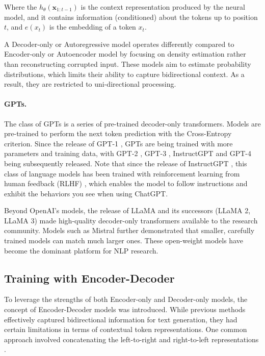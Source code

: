 Where the $h_{\theta}(\textbf{x}_{1:t-1})$ is the context representation produced by the neural model, and it contains information (conditioned) about the tokens up to position $t$, and $e(x_t)$ is the embedding of a token $x_t$.

A Decoder-only or Autoregressive model operates differently compared to Encoder-only or Autoencoder model by focusing on density estimation rather than reconstructing corrupted input. These models aim to estimate probability distributions, which limits their ability to capture bidirectional context. As a result, they are restricted to uni-directional processing.

\paragraph{GPTs.} The class of GPTs is a series of pre-trained decoder-only transformers. Models are pre-trained to perform the next token prediction with the Cross-Entropy criterion. Since the release of GPT-1 \citep{gpt-1}, GPTs are being trained with more parameters and training data, with GPT-2 \citep{gpt-2}, GPT-3 \citep{gpt-3}, InstructGPT \citep{instructgpt} and GPT-4 \citep{gpt-4} being subsequently released. Note that since the release of InstructGPT \citep{instructgpt}, this class of language models has been trained with reinforcement learning from human feedback (RLHF) \citep{rlhf}, which enables the model to follow instructions and exhibit the behaviors you see when using ChatGPT.

Beyond OpenAI's models, the release of LLaMA \citep{touvron2023llama} and its successors (LLaMA 2, LLaMA 3) made high-quality decoder-only transformers available to the research community. Models such as Mistral \citep{jiang2023mistral} further demonstrated that smaller, carefully trained models can match much larger ones. These open-weight models have become the dominant platform for NLP research.


\subsection{Training with Encoder-Decoder}
To leverage the strengths of both Encoder-only and Decoder-only models, the concept of Encoder-Decoder models was introduced. While previous methods effectively captured bidirectional information for text generation, they had certain limitations in terms of contextual token representations. One common approach involved concatenating the left-to-right and right-to-left representations \cite{peters2018deep}.

